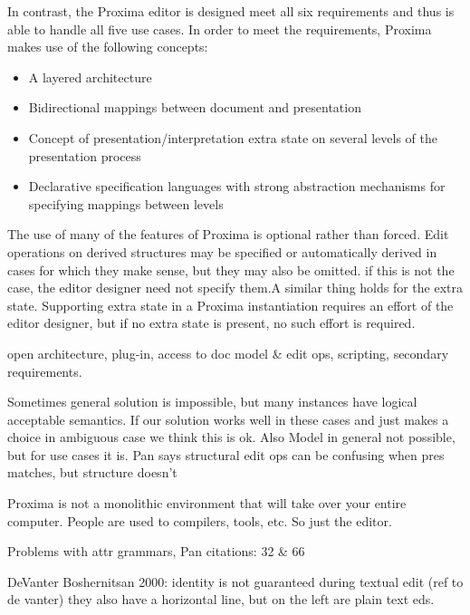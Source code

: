 In contrast, the Proxima editor is designed meet all six requirements and thus is able to handle all five use cases. In order to meet the requirements, Proxima makes use of the following concepts:

\begin{itemize}
\item A layered architecture
\item Bidirectional mappings between document and presentation
\item Concept of presentation/interpretation extra state on several levels of the presentation process
\item Declarative specification languages with strong abstraction mechanisms for specifying mappings between levels
\end{itemize}

The use of many of the features of Proxima is optional rather than forced. Edit operations on derived structures may be specified or automatically derived in cases for which they make sense, but they may also be omitted. \bc if this is not the case, the editor designer need not specify them.\ec A similar thing holds for the extra state. Supporting extra state in a Proxima instantiation requires an effort of the editor designer, but if no extra state is present, no such effort is required.



\bc

 open architecture, plug-in, access to doc model & edit ops, scripting, secondary requirements.

Sometimes general solution is impossible, but many instances have logical acceptable semantics. If our solution works well in these cases and just makes a choice in ambiguous case we think this is ok. Also Model in general not possible, but for use cases it is. Pan says structural edit ops can be confusing when pres matches, but structure doesn't

Proxima is not a monolithic environment that will take over your entire computer. People are used to compilers, tools, etc. So just the editor. 


Problems with attr grammars, Pan citations: 32 \& 66


DeVanter Boshernitsan 2000: identity is not guaranteed during textual edit (ref to de vanter)
they also have a horizontal line, but on the left are plain text eds.




